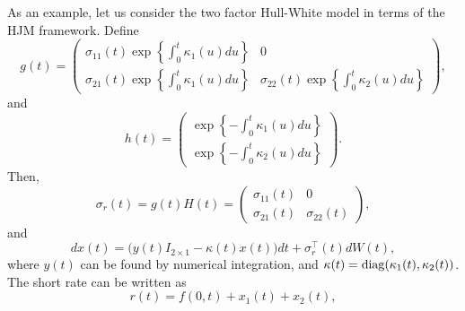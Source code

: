 \documentclass[12pt]{article}
\begin{document}
  As an example, let us consider the two factor Hull-White model in terms of the HJM framework. Define
  \begin{equation}
    g(t)=\left(
            \begin{array}{cc}
              \sigma_{11}(t)\exp\left\{\int_0^t\kappa_1(u)du\right\} & 0 \\
              \sigma_{21}(t)\exp\left\{\int_0^t\kappa_1(u)du\right\} & \sigma_{22}(t)\exp\left\{\int_0^t\kappa_2(u)du\right\}
            \end{array}
         \right),
  \end{equation}
  and
  \begin{equation}
    h(t)=\left(
            \begin{array}{c}
              \exp\left\{-\int_0^t\kappa_1(u)du\right\}\\
              \exp\left\{-\int_0^t\kappa_2(u)du\right\}
            \end{array}
         \right).
  \end{equation}
  Then,
  \begin{equation}
    \sigma_r(t)=g(t)H(t)=\left(
            \begin{array}{cc}
              \sigma_{11}(t) & 0 \\
              \sigma_{21}(t) & \sigma_{22}(t)
            \end{array}
         \right),
  \end{equation}
  and
  \begin{equation}
    dx(t)=\Big(y(t)I_{2\times 1}-\kappa(t)x(t)\Big)dt+\sigma_r^{{\top}}(t)dW(t),
  \end{equation}
  where $y(t)$ can be found by numerical integration, and $\kappa(t)={\rm diag}(\kappa_1(t),\kappa_2(t))$. The short rate can be
  written as
  \begin{equation}
    r(t)=f(0,t)+x_1(t)+x_2(t),
  \end{equation}
\end{document}
